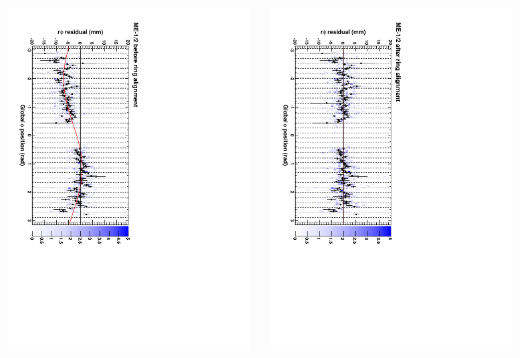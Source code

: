 \documentclass[compress]{beamer}
\begin{document}
\begin{frame}
\begin{columns}
\includegraphics[height=0.95\linewidth, angle=90]{ringfits_before_mem12.pdf}

\includegraphics[height=0.95\linewidth, angle=90]{ringfits_after_mem12.pdf}
\end{columns}
\end{frame}
\end{document}
